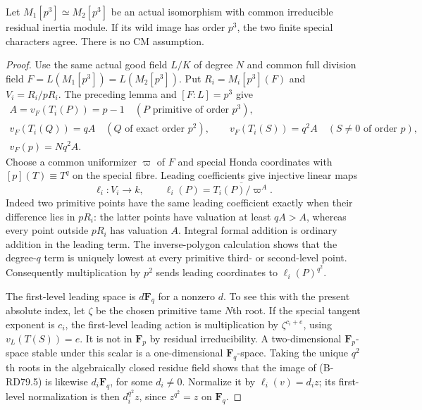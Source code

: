 \begin{proposition}
\label{prop:B-RD79-minimal}
Let \(M_1[p^3]\simeq M_2[p^3]\) be an actual isomorphism with
common irreducible residual inertia module. If its wild image
has order \(p^3\), the two finite special characters agree.
There is no CM assumption.
\end{proposition}
\begin{proof}
Use the same actual good field \(L/K\) of degree \(N\) and
common full division field
\(F=L(M_1[p^3])=L(M_2[p^3])\). Put \(R_i=M_i[p^3](F)\) and
\(V_i=R_i/pR_i\). The preceding lemma and \([F:L]=p^3\) give
\[
 \begin{gathered}
 A=v_F(T_i(P))=p-1\quad(P\text{ primitive of order }p^3),\\
 v_F(T_i(Q))=qA\quad(Q\text{ of exact order }p^2),\qquad
 v_F(T_i(S))=q^2A\quad(S\ne0\text{ of order }p),\\
                           v_F(p)=Nq^2A.
 \end{gathered}                                        \tag{B-RD79.4}
\]
Choose a common uniformizer \(\varpi\) of \(F\) and special
Honda coordinates with \([p](T)\equiv T^q\) on the special
fibre. Leading coefficients give injective linear maps
\[
       \ell_i:V_i\longrightarrow k,\qquad
       \ell_i(P)=\overline{T_i(P)/\varpi^A}.
                                                     \tag{B-RD79.5}
\]
Indeed two primitive points have the same leading coefficient
exactly when their difference lies in \(pR_i\): the latter
points have valuation at least \(qA>A\), whereas every point
outside \(pR_i\) has valuation \(A\). Integral formal addition
is ordinary addition in the leading term. The inverse-polygon
calculation shows that the degree-\(q\) term is uniquely lowest
at every primitive third- or second-level point. Consequently
multiplication by \(p^2\) sends leading coordinates to
\(\ell_i(P)^{q^2}\).

The first-level leading space is \(d\mathbf F_q\) for a nonzero
\(d\). To see this with the present absolute index, let
\(\zeta\) be the chosen primitive tame \(N\)th root. If the
special tangent exponent is \(c_i\), the first-level leading
action is multiplication by \(\zeta^{c_i+e}\), using
\(v_L(T(S))=e\). It is not in \(\mathbf F_p\) by residual
irreducibility. A two-dimensional \(\mathbf F_p\)-space stable
under this scalar is a one-dimensional \(\mathbf F_q\)-space.
Taking the unique \(q^2\)th roots in the algebraically closed
residue field shows that the image of (B-RD79.5) is likewise
\(d_i\mathbf F_q\), for some \(d_i\ne0\). Normalize it by
\(\ell_i(v)=d_i z\); its first-level normalization is then
\(d_i^{q^2}z\), since \(z^{q^2}=z\) on \(\mathbf F_q\).


\end{proof}
